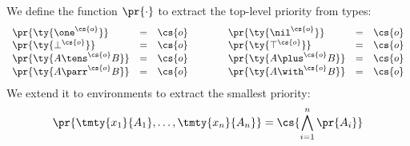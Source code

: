 \begin{definition}\label{def:ccp-pr}
  We define the function $\pr{\cdot}$ to extract the top-level priority from types:
  \begin{gather*}
    \begin{array}{lclclcl}
      {}\pr{\ty{\one^{\cs{o}}}}      & = & \cs{o} & \qquad
      & \pr{\ty{\nil^{\cs{o}}}}      & = & \cs{o} \\
      {}\pr{\ty{\bot^{\cs{o}}}}      & = & \cs{o} & \qquad
      & \pr{\ty{\top^{\cs{o}}}}      & = & \cs{o} \\
      {}\pr{\ty{A \tens^{\cs{o}} B}} & = & \cs{o} & \qquad
      & \pr{\ty{A \plus^{\cs{o}} B}} & = & \cs{o} \\
      {}\pr{\ty{A \parr^{\cs{o}} B}} & = & \cs{o} & \qquad
      & \pr{\ty{A \with^{\cs{o}} B}} & = & \cs{o}
    \end{array}
  \end{gather*}
  We extend it to environments to extract the smallest priority:
  \begin{gather*}
    \pr{\tmty{x_1}{A_1}, \dots, \tmty{x_n}{A_n}} = \cs{\bigwedge_{i=1}^{n}\pr{A_i}}
  \end{gather*} 
\end{definition}
